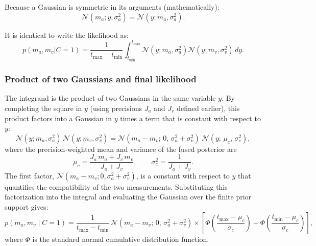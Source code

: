\documentclass[9pt,lineno,doublespacing]{elife}
\begin{document}
Because a Gaussian is symmetric in its arguments (mathematically):
\begin{equation}
\mathcal{N}(m_a; y, \sigma_a^2) = \mathcal{N}(y; m_a, \sigma_a^2).
\end{equation}

It is identical to write the likelihood as:
\begin{equation}
p(m_a, m_v | C=1) = \frac{1}{t_{\max} - t_{\min}} \int_{t_{\min}}^{t_{\max}} \mathcal{N}(y; m_a, \sigma_a^2) \mathcal{N}(y; m_v, \sigma_v^2) \, dy.
\end{equation}

\subsubsection{Product of two Gaussians and final likelihood}

The integrand is the product of two Gaussians in the same variable $y$.  By completing the square in $y$ (using precisions $J_a$ and $J_v$ defined earlier), this product factors into a Gaussian in $y$ times a term that is constant with respect to $y$:
\begin{equation}
\label{eq:product_gaussians_factorization}
\mathcal{N}(y; m_a, \sigma_a^2)\, \mathcal{N}(y; m_v, \sigma_v^2) 
= \mathcal{N}(m_a - m_v;\, 0,\, \sigma_a^2 + \sigma_v^2)\;\mathcal{N}(y;\, \mu_c,\, \sigma_c^2),
\end{equation}
where the precision-weighted mean and variance of the fused posterior are
\begin{equation}
\mu_c = \frac{J_a\, m_a + J_v\, m_v}{J_a + J_v}, 
\qquad
\sigma_c^2 = \frac{1}{J_a + J_v}.
\end{equation}
The first factor, $\mathcal{N}(m_a - m_v; 0, \sigma_a^2 + \sigma_v^2)$, is a constant with respect to $y$ that quantifies the compatibility of the two measurements.  Substituting this factorization into the integral and evaluating the Gaussian over the finite prior support gives:
\begin{equation}
\label{eq:likelihood_c1_final}
p(m_a, m_v \mid C\!=\!1) = \frac{1}{t_{\max} - t_{\min}}\, \mathcal{N}(m_a - m_v;\, 0,\, \sigma_a^2 + \sigma_v^2) 
\times \left[\Phi\!\left(\frac{t_{\max} - \mu_c}{\sigma_c}\right) - \Phi\!\left(\frac{t_{\min} - \mu_c}{\sigma_c}\right)\right],
\end{equation}
where $\Phi$ is the standard normal cumulative distribution function.


\end{document}
